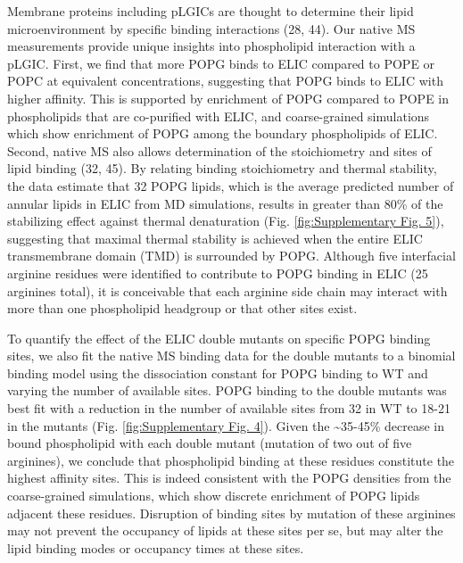 Membrane proteins including pLGICs are thought to determine their lipid
microenvironment by specific binding interactions (28, 44). Our native
MS measurements provide unique insights into phospholipid interaction
with a pLGIC. First, we find that more POPG binds to ELIC compared to
POPE or POPC at equivalent concentrations, suggesting that POPG binds to
ELIC with higher affinity. This is supported by enrichment of POPG
compared to POPE in phospholipids that are co-purified with ELIC, and
coarse-grained simulations which show enrichment of POPG among the
boundary phospholipids of ELIC. Second, native MS also allows
determination of the stoichiometry and sites of lipid binding (32, 45).
By relating binding stoichiometry and thermal stability, the data
estimate that 32 POPG lipids, which is the average predicted number of
annular lipids in ELIC from MD simulations, results in greater than 80\%
of the stabilizing effect against thermal denaturation (Fig. \ref{fig:Supplementary
Fig. 5}), suggesting that maximal thermal stability is achieved when the
entire ELIC transmembrane domain (TMD) is surrounded by POPG. Although
five interfacial arginine residues were identified to contribute to POPG
binding in ELIC (25 arginines total), it is conceivable that each
arginine side chain may interact with more than one phospholipid
headgroup or that other sites exist.

To quantify the effect of the ELIC double mutants on specific POPG
binding sites, we also fit the native MS binding data for the double
mutants to a binomial binding model using the dissociation constant for
POPG binding to WT and varying the number of available sites. POPG
binding to the double mutants was best fit with a reduction in the
number of available sites from 32 in WT to 18-21 in the mutants
(Fig. \ref{fig:Supplementary Fig. 4}). Given the \textasciitilde{}35-45\% decrease in
bound phospholipid with each double mutant (mutation of two out of five
arginines), we conclude that phospholipid binding at these residues
constitute the highest affinity sites. This is indeed consistent with
the POPG densities from the coarse-grained simulations, which show
discrete enrichment of POPG lipids adjacent these residues. Disruption
of binding sites by mutation of these arginines may not prevent the
occupancy of lipids at these sites per se, but may alter the lipid
binding modes or occupancy times at these sites.

